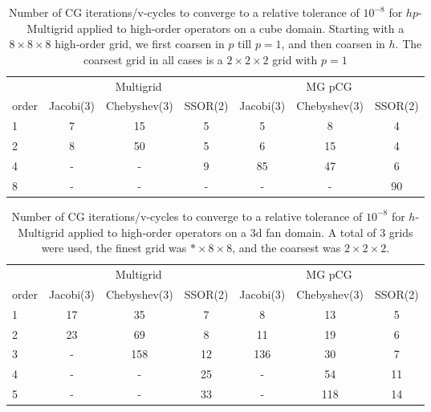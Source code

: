 \begin{table}
  \caption{\label{tab:hpmg} Number of CG iterations/v-cycles to converge to a relative tolerance of $10^{-8}$ for $hp$-Multigrid applied to high-order operators on a cube domain. Starting with a $8\times 8\times 8$ high-order grid, we first coarsen in $p$ till $p=1$, and then coarsen in $h$. The coarsest grid in all cases is a $2\times 2\times 2$ grid with $p=1$}
		\centering
		\begin{tabular}{|l|c|c|c|c|c|c|} 
	    \hline
				    & \multicolumn{3}{c|}{Multigrid} & \multicolumn{3}{c|}{MG pCG}\\  \cline{2-7}
			order & \scriptsize Jacobi(3)  &\scriptsize  Chebyshev(3)  &\scriptsize SSOR(2) &\scriptsize Jacobi(3)  &\scriptsize  Chebyshev(3)  &\scriptsize SSOR(2) \\
			\hline
        1 & 7 & 15 & 5 & 5 & 8 & 4 \\
        2 & 8 & 50 & 5 & 6 & 15 & 4 \\
			  4 & - & - & 9 & 85 & 47 & 6 \\
        8 & - & - & - & -  &  - & 90 \\
      \hline
	  \end{tabular}
\end{table}

\begin{table}
  \caption{\label{tab:homg} Number of CG iterations/v-cycles to converge to a relative tolerance of $10^{-8}$ for $h$-Multigrid applied to high-order operators on a 3d fan domain. A total of 3 grids were used, the finest grid was $*\times 8\times 8$, and the coarsest was $2\times 2\times 2$.}
		\centering
    \begin{tabular}{|l|c|c|c|c|c|c|} 
	    \hline
				    & \multicolumn{3}{c|}{Multigrid} & \multicolumn{3}{c|}{MG pCG}\\  \cline{2-7}
			order & \scriptsize Jacobi(3)  &\scriptsize  Chebyshev(3)  &\scriptsize SSOR(2) &\scriptsize Jacobi(3)  &\scriptsize  Chebyshev(3)  &\scriptsize SSOR(2) \\
			\hline
        1 & 17 & 35 & 7 & 8 & 13 & 5 \\
        2 & 23 & 69 & 8 & 11 & 19 & 6 \\  
        3 & -  & 158 & 12 & 136 & 30 & 7 \\
        4 & - & - & 25 & - & 54 & 11 \\
        5 & - & - & 33 & - & 118 & 14 \\ 
			\hline
	  \end{tabular}
\end{table}

